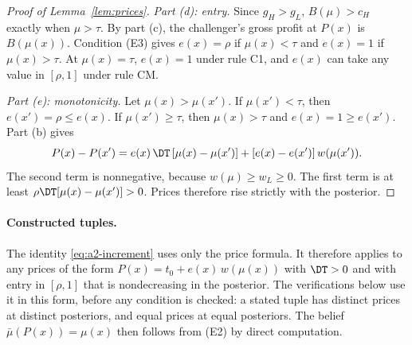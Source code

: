 \begin{proof}[Proof of Lemma~\ref{lem:prices}]
\emph{Part (d): entry.} Since \(g_H>g_L\), \(B(\mu)>c_H\) exactly when \(\mu>\tau\). By part (c), the
challenger's gross profit at \(P(x)\) is \(B(\mu(x))\). Condition (E3) gives \(e(x)=\rho\) if \(\mu(x)<\tau\) and
\(e(x)=1\) if \(\mu(x)>\tau\). At \(\mu(x)=\tau\), \(e(x)=1\) under rule C1, and \(e(x)\) can take any value in
\([\rho,1]\) under rule CM.

\emph{Part (e): monotonicity.} Let \(\mu(x)>\mu(x')\). If \(\mu(x')<\tau\), then \(e(x')=\rho\le e(x)\). If
\(\mu(x')\ge\tau\), then \(\mu(x)>\tau\) and \(e(x)=1\ge e(x')\). Part (b) gives
\begin{equation}\label{eq:a2-increment}
P(x)-P(x')=e(x)\,\DT\,[\mu(x)-\mu(x')]+[e(x)-e(x')]\,w(\mu(x')) .
\end{equation}
The second term is nonnegative, because \(w(\mu)\ge w_L\ge0\). The first term is at least
\(\rho\DT[\mu(x)-\mu(x')]>0\). Prices therefore rise strictly with the posterior.
\end{proof}

\paragraph{Constructed tuples.}
The identity \eqref{eq:a2-increment} uses only the price formula. It therefore applies to any prices of the form
\(P(x)=t_0+e(x)\,w(\mu(x))\) with \(\DT>0\) and with entry in \([\rho,1]\) that is nondecreasing in the posterior.
The verifications below use it in this form, before any condition is checked: a stated tuple has distinct prices at
distinct posteriors, and equal prices at equal posteriors. The belief \(\bar\mu(P(x))=\mu(x)\) then follows from
(E2) by direct computation.


